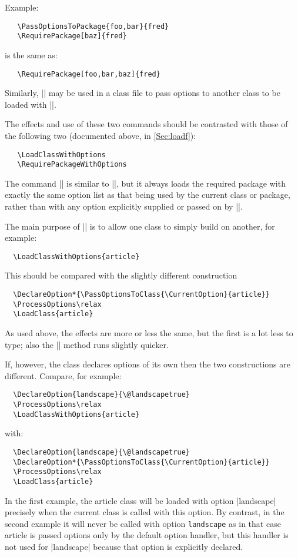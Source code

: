 \documentclass{ltxguide}[1995/11/28]
\begin{document}
Example:
\begin{verbatim}
   \PassOptionsToPackage{foo,bar}{fred}
   \RequirePackage[baz]{fred}
\end{verbatim}
is the same as:
\begin{verbatim}
   \RequirePackage[foo,bar,baz]{fred}
\end{verbatim}

Similarly, |\PassOptionsToClass| may be used in a class file to pass
options to another class to be loaded with |\LoadClass|.

The effects and use of these two commands should be contrasted with
those of the following two (documented above, in \ref{Sec:loadf}):
\begin{verbatim}
   \LoadClassWithOptions
   \RequirePackageWithOptions
\end{verbatim}
The command || is similar to
|\RequirePackage|, but it always loads the required package with
exactly the same option list as that being used by the current class
or package, rather than with any option explicitly supplied or passed
on by |\PassOptionsToPackage|.

The main purpose of |\LoadClassWithOptions| is to allow one class to
simply build on another, for example:
\begin{verbatim}
  \LoadClassWithOptions{article}
\end{verbatim}
This should be compared with the slightly different construction
\begin{verbatim}
  \DeclareOption*{\PassOptionsToClass{\CurrentOption}{article}}
  \ProcessOptions\relax
  \LoadClass{article}
\end{verbatim}
As used above, the effects are more or less the same, but the first is
a lot less to type; also the |\LoadClassWithOptions| method runs
slightly quicker.

If, however, the class declares options of its own then
the two constructions are different.  Compare, for example:
\begin{verbatim}
  \DeclareOption{landscape}{\@landscapetrue}
  \ProcessOptions\relax
  \LoadClassWithOptions{article}
\end{verbatim}
with:
\begin{verbatim}
  \DeclareOption{landscape}{\@landscapetrue}
  \DeclareOption*{\PassOptionsToClass{\CurrentOption}{article}}
  \ProcessOptions\relax
  \LoadClass{article}
\end{verbatim}
In the first example, the \textsf{article} class will be loaded with
option |landscape| precisely when the current class is called with
this option. By contrast, in the second example it will never be
called with option \texttt{landscape} as in that case \textsf{article}
is passed options only by the default option handler, but this handler
is not used for |landscape| because that option is explicitly
declared.
\end{document}

